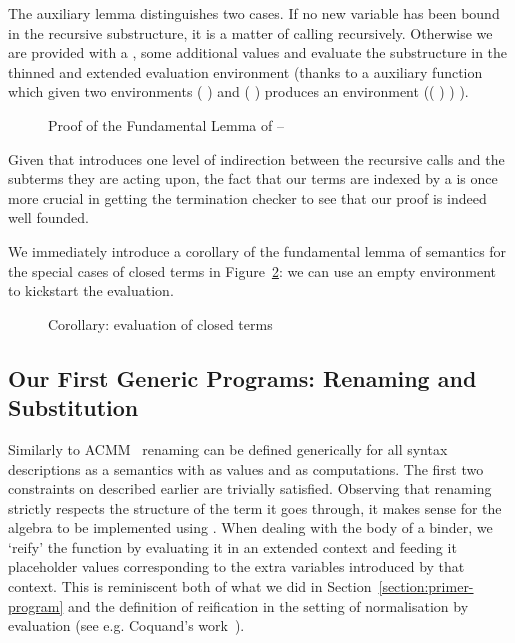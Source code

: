 The auxiliary lemma  distinguishes two cases. If no new
variable has been bound in the recursive substructure, it is
a matter of calling \semfun{} recursively. Otherwise we are provided
with a , some additional values and evaluate the
substructure in the thinned and extended evaluation environment
(thanks to a auxiliary function \AF{\_>>\_} which given two environments
{( )  } and {( )  }
produces an environment {(( \AF{++} ) )  )}.

\begin{figure}[h]
\caption{Proof of the Fundamental Lemma of \semrec{} -- }\label{def:body}
\end{figure}

Given that  introduces one level of indirection between the
recursive calls and the subterms they are acting upon, the fact
that our terms are indexed by a  is once more crucial in
getting the termination checker to see that our proof is indeed
well founded.

We immediately introduce a corollary of the fundamental lemma of semantics
for the special cases of closed terms in Figure~\ref{fig:evalclosed}: we
can use an empty environment to kickstart the evaluation.

\begin{figure}[h]
\caption{Corollary: evaluation of closed terms}\label{fig:evalclosed}
\end{figure}

\subsection{Our First Generic Programs: Renaming and Substitution}\label{section:renandsub}

Similarly to ACMM~\citeyear{allais2017type} renaming can be defined generically
for all syntax descriptions as a semantics with  as values and  as
computations. The first two constraints on  described earlier are trivially
satisfied. Observing that renaming strictly respects the structure of the term it
goes through, it makes sense for the algebra to be implemented using .
When dealing with the body of a binder, we `reify' the  function by
evaluating it in an extended context and feeding it placeholder values corresponding to
the extra variables introduced by that context. This is reminiscent both of what we
did in Section~\ref{section:primer-program} and the definition of reification in
the setting of normalisation by evaluation (see e.g. Coquand's work~\citeyear{coquand2002formalised}).

